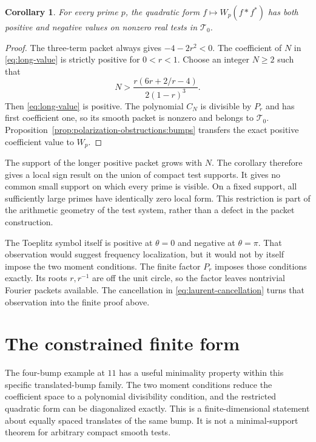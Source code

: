 \documentclass[11pt,letterpaper]{article}
\newtheorem{corollary}[theorem]{Corollary}
\theoremstyle{definition}
\theoremstyle{remark}
\newcommand{\T}{\mathcal T}
\begin{document}
\begin{corollary}
\label{cor:all-prime-signs}
For every prime $p$, the quadratic form $f\mapsto W_p(f*f^*)$
has both positive and negative values on nonzero real
tests in $\T_0$.
\end{corollary}
\begin{proof}
The three-term packet always gives $-4-2r^2<0$.
The coefficient of $N$ in \eqref{eq:long-value} is strictly
positive for $0<r<1$. Choose an integer $N\geq2$ such that
\[
 N>\frac{r(6r+2/r-4)}{2(1-r)^3}.
\]
Then \eqref{eq:long-value} is positive. The polynomial
$C_N$ is divisible by $P_r$ and has first coefficient one,
so its smooth packet is nonzero and belongs to $\T_0$.
Proposition~\ref{prop:polarization-obstructions:bumps}
transfers the exact positive coefficient value to $W_p$.
\end{proof}

The support of the longer positive packet grows with $N$.
The corollary therefore gives a local sign result on the union
of compact test supports. It gives no common small support
on which every prime is visible. On a fixed support, all
sufficiently large primes have identically zero local form.
This restriction is part of the arithmetic geometry of the
test system, rather than a defect in the packet construction.

The Toeplitz symbol itself is positive at $\theta=0$ and
negative at $\theta=\pi$. That observation would suggest
frequency localization, but it would not by itself impose
the two moment conditions. The finite factor $P_r$ imposes
those conditions exactly. Its roots $r,r^{-1}$ are off the
unit circle, so the factor leaves nontrivial Fourier packets
available. The cancellation in \eqref{eq:laurent-cancellation}
turns that observation into the finite proof above.

\section{The constrained finite form}
\label{sec:finite-form}

The four-bump example at $11$ has a useful minimality property
within this specific translated-bump family. The two moment
conditions reduce the coefficient space to a polynomial
divisibility condition, and the restricted quadratic form can
be diagonalized exactly. This is a finite-dimensional statement
about equally spaced translates of the same bump. It is not
a minimal-support theorem for arbitrary compact smooth tests.
\end{document}
